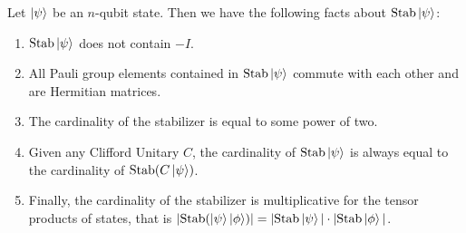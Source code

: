 \documentclass[12pt]{dalthesis}
\begin{document}
\begin{proposition}
\label{stabilizerfacts}
Let $\ket{\psi}$ be an $n$-qubit state. Then we have the following facts about $\mathrm{Stab}\ket{\psi}$:
\begin{enumerate}
\item $\mathrm{Stab}\ket{\psi}$ does not contain $-I$.
\item All Pauli group elements contained in $\mathrm{Stab}\ket{\psi}$ commute with each other and are Hermitian matrices.
\item The cardinality of the stabilizer is equal to some power of two.
\item Given any Clifford Unitary $C$, the cardinality of $\mathrm{Stab}\ket{\psi}$ is always equal to the cardinality of $\mathrm{Stab}(C \ket{\psi})$.
\item Finally, the cardinality of the stabilizer is multiplicative for the tensor products of states, that is $| \mathrm{Stab} (\ket{\psi} \ket{\phi})| = |\mathrm{Stab}\ket{\psi}| \cdot |\mathrm{Stab}\ket{\phi}|$. 
\end{enumerate}
\end{proposition}
\end{document}
